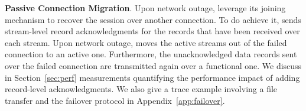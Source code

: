 \textbf{Passive Connection Migration}. 
Upon network outage, \tcpls leverage its joining mechanism to recover the session
over another \tcp connection. To do achieve it, \tcpls sends stream-level record
acknowledgments for the records that have been received
over each stream. Upon network outage, \tcpls moves the
active streams out of the failed \tcp connection to an active one. Furthermore,
the unacknowledged data records sent over the failed \tcp connection are
transmitted again over a functional one.
We discuss in Section~\ref{sec:perf} measurements quantifying the
performance impact of adding \tcpls record-level acknowledgments. We also give a
trace example involving a file transfer and the failover protocol in
Appendix~\ref{app:failover}.

